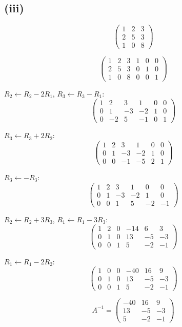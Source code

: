 \subsection*{(iii)}
\[
	\begin{pmatrix}
		1 & 2 & 3 \\
		2 & 5 & 3 \\
		1 & 0 & 8
	\end{pmatrix}
\]

\[
	\left(\begin{array}{ccc|ccc}
			1 & 2 & 3 & 1 & 0 & 0 \\
			2 & 5 & 3 & 0 & 1 & 0 \\
			1 & 0 & 8 & 0 & 0 & 1
		\end{array}\right)
\]

$R_2 \leftarrow R_2 - 2R_1$, $R_3 \leftarrow R_3 - R_1$:
\[
	\left(\begin{array}{ccc|ccc}
			1 & 2  & 3  & 1  & 0 & 0 \\
			0 & 1  & -3 & -2 & 1 & 0 \\
			0 & -2 & 5  & -1 & 0 & 1
		\end{array}\right)
\]

$R_3 \leftarrow R_3 + 2R_2$:
\[
	\left(\begin{array}{ccc|ccc}
			1 & 2 & 3  & 1  & 0 & 0 \\
			0 & 1 & -3 & -2 & 1 & 0 \\
			0 & 0 & -1 & -5 & 2 & 1
		\end{array}\right)
\]

$R_3 \leftarrow -R_3$:
\[
	\left(\begin{array}{ccc|ccc}
			1 & 2 & 3  & 1  & 0  & 0  \\
			0 & 1 & -3 & -2 & 1  & 0  \\
			0 & 0 & 1  & 5  & -2 & -1
		\end{array}\right)
\]

$R_2 \leftarrow R_2 + 3R_3$, $R_1 \leftarrow R_1 - 3R_3$:
\[
	\left(\begin{array}{ccc|ccc}
			1 & 2 & 0 & -14 & 6  & 3  \\
			0 & 1 & 0 & 13  & -5 & -3 \\
			0 & 0 & 1 & 5   & -2 & -1
		\end{array}\right)
\]

$R_1 \leftarrow R_1 - 2R_2$:
\[
	\left(\begin{array}{ccc|ccc}
			1 & 0 & 0 & -40 & 16 & 9  \\
			0 & 1 & 0 & 13  & -5 & -3 \\
			0 & 0 & 1 & 5   & -2 & -1
		\end{array}\right)
\]

\[
	A^{-1} = \begin{pmatrix}
		-40 & 16 & 9  \\
		13  & -5 & -3 \\
		5   & -2 & -1
	\end{pmatrix}
\]
